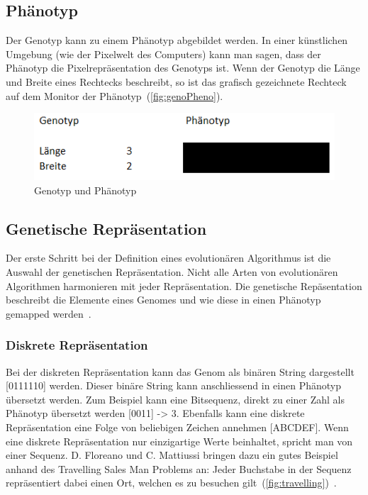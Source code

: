     \subsection{Phänotyp\label{sub:phenotyp}}
      Der Genotyp kann zu einem Phänotyp abgebildet werden.
      In einer künstlichen Umgebung (wie der Pixelwelt des Computers) kann man sagen,
      dass der Phänotyp die Pixelrepräsentation des Genotyps ist.
      Wenn der Genotyp die Länge und Breite eines Rechtecks beschreibt, so ist das grafisch gezeichnete Rechteck auf dem Monitor der Phänotyp~(\vref{fig:genoPheno}).
      \begin{figure}[H]
        \includegraphics[scale=1]{graphics/genotyp_phenotyp}
        \caption{Genotyp und Phänotyp\label{fig:genoPheno}}
      \end{figure}

    \subsection{Genetische Repräsentation}

    Der erste Schritt bei der Definition eines evolutionären Algorithmus ist die Auswahl der genetischen Repräsentation.
    Nicht alle Arten von evolutionären Algorithmen harmonieren mit jeder Repräsentation.
    Die genetische Repäsentation beschreibt die Elemente eines Genomes und wie diese in einen Phänotyp gemapped werden~\cite[S.16]{book:bioInspired}.

      \subsubsection{Diskrete Repräsentation\label{par:GeneticRepresentationDiscrete}}

        Bei der diskreten Repräsentation kann das Genom als binären String dargestellt [0111110] werden.
        Dieser binäre String kann anschliessend in einen Phänotyp übersetzt werden.
        Zum Beispiel kann eine Bitsequenz, direkt zu einer Zahl als Phänotyp übersetzt werden [0011] -> 3.
        Ebenfalls kann eine diskrete Repräsentation eine Folge von beliebigen Zeichen annehmen [ABCDEF].
        Wenn eine diskrete Repräsentation nur einzigartige Werte beinhaltet, spricht man von einer Sequenz.
        D. Floreano und C. Mattiussi bringen dazu ein gutes Beispiel anhand des Travelling Sales Man Problems an:
        Jeder Buchstabe in der Sequenz repräsentiert dabei einen Ort, welchen es zu besuchen gilt~(\vref{fig:travelling})~\cite[S.18]{book:bioInspired}.

